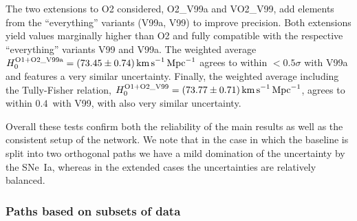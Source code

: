 The two extensions to O2 considered, O2\_V99a and VO2\_V99, add elements from the ``everything'' variants (V99a, V99) to improve precision. Both extensions yield \Hcst{} values marginally higher than O2 and fully compatible with the respective ``everything'' variants V99 and V99a. The weighted average $H_0^\mathrm{O1+O2\_V99a} = (73.45\pm 0.74)\,{\rm km\,s}^{-1}{\rm\,Mpc}^{-1}$ agrees to within $< 0.5\sigma$ with V99a and features a very similar uncertainty. Finally, the weighted average including the Tully-Fisher relation, $H_0^\mathrm{O1+O2\_V99} = (73.77\pm 0.71)\,{\rm km\,s}^{-1}{\rm\,Mpc}^{-1}$, agrees to within $0.4$\,\Hunit{} with V99, with also very similar uncertainty.

Overall these tests confirm both the reliability of the main results as well as the consistent setup of the network. We note that in the case in which the baseline is split into two orthogonal paths we have a mild domination of the uncertainty by the SNe~Ia, whereas in the extended cases the uncertainties are relatively balanced.

\subsubsection{Paths based on subsets of data} \label{sec:consistency_checks}

